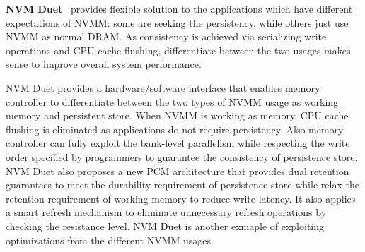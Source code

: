 \textbf{NVM Duet}~\cite{duet} provides flexible solution to the applications
which
have different expectations of NVMM: some are seeking the persistency, while
others just use NVMM as normal DRAM. As consistency is achieved via serializing
write operations and CPU cache flushing, differentiate between the two usages
makes sense to improve overall system performance.

NVM Duet provides a hardware/software interface that enables memory controller
to differentiate between the two types of NVMM usage as working memory and
persistent store. When NVMM is working as memory, CPU cache flushing is
eliminated as applications do not require persistency. Also memory controller
can fully exploit the bank-level parallelism while respecting the write order 
specified by programmers to guarantee the consistency of persistence store.
NVM Duet also proposes a new PCM architecture that provides dual retention
guarantees to meet the durability requirement of persistence store while relax
the retention requirement of working memory to reduce write latency. It also
applies a smart refresh mechanism to eliminate unnecessary refresh operations
by checking the resistance level. NVM Duet is another exmaple of exploiting
optimizations from the different NVMM usages.
